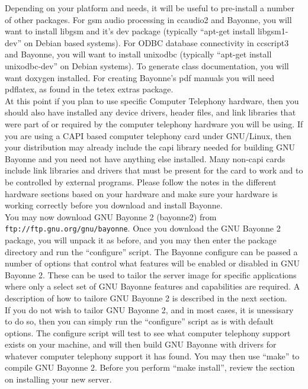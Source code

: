 \documentclass[a4paper,12pt]{article}
\begin{document}
Depending on your platform and needs, it will be useful to pre-install a
number of other packages.  For gsm audio processing in ccaudio2 and
Bayonne, you will want to install libgsm and it's dev package (typically
``apt-get install libgsm1-dev'' on Debian based systems).  For ODBC
database connectivity in ccscript3 and Bayonne, you will want to install
unixodbc (typically ``apt-get install unixodbc-dev'' on Debian systems).
To generate class documentation, you will want doxygen installed.  For
creating Bayonne's pdf manuals you will need pdflatex, as found in the
tetex extras package. \\

At this point if you plan to use specific Computer Telephony hardware,
then you should also have installed any device drivers, header files,
and link libraries that were part of or required by the computer
telephony hardware you will be using.  If you are using a CAPI based
computer telephony card under GNU/Linux, then your distribution may
already include the capi library needed for building GNU Bayonne and you
need not have anything else installed. Many non-capi cards include link
libraries and drivers that must be present for the card to work and to
be controlled by external programs. Please follow the notes in the
different hardware sections based on your hardware and make sure your
hardware is working correctly before you download and install Bayonne. \\

You may now download GNU Bayonne 2 (bayonne2) from {\tt ftp://ftp.gnu.org/gnu/bayonne}.
Once you download the GNU Bayonne 2 package, you will unpack it as before,  
and you may then enter the package directory and run the ``configure''  
script.  The Bayonne configure can be passed a number of options that   
control what features will be enabled or disabled in GNU Bayonne 2.  These
can be used to tailor the server image for specific applications where
only a select set of GNU Bayonne features and capabilities are required.   
A description of how to tailore GNU Bayonne 2 is described in the next     
section. \\

If you do not wish to tailor GNU Bayonne 2, and in most cases, it is       
unessisary to do so, then you can simply run the ``configure'' script as
is with default options.  The configure script will test to see what   
computer telephony support exists on your machine, and will then build GNU
Bayonne with drivers for whatever computer telephony support it has found.
You may then use ``make'' to compile GNU Bayonne 2.  Before you perform
``make install'', review the section on installing your new server.\\
\end{document}
